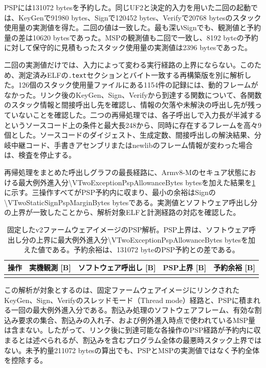 \documentclass[a4paper,10pt]{ltjsarticle}
\theoremstyle{definition}
\theoremstyle{remark}
\begin{document}
PSPには\num{131072} bytesを予約した。同じUF2と決定的入力を用いた二回の起動では、KeyGenで\num{91980} bytes、Signで\num{120452} bytes、Verifyで\num{20768} bytesのスタック使用量の実測値を得た。二回の値は一致した。最も深いSignでも、観測値と予約量の差は\num{10620} bytesであった。MSPの観測値も二回で一致し、\num{8192} byteの予約に対して保守的に見積もったスタック使用量の実測値は\num{2396} bytesであった。

二回の実測値だけでは、入力によって変わる実行経路の上界にならない。このため、測定済みELFの\texttt{.text}セクションとバイト一致する再構築版を別に解析した。126個のスタック使用量ファイルにある1154件の記録には、動的フレームがなかった。リンク後のKeyGen、Sign、Verifyから到達する関数について、各関数のスタック情報と間接呼出し先を確認し、情報の欠落や未解決の呼出し先が残っていないことを確認した。二つの再帰処理では、各子呼出しで入力長が半減するというソースコード上の条件と最大長248から、同時に存在するフレームを高々9個とした。ソースコードのダイジェスト、生成定数、間接呼出しの解決結果、分岐中継コード、手書きアセンブリまたはnewlibのフレーム情報が変わった場合は、検査を停止する。

再帰処理をまとめた呼出しグラフの最長経路に、Armv8-Mのセキュア状態における最大例外進入分\num{\VTwoExceptionPspAllowanceBytes} bytesを加えた結果を\cref{tab:v2-static-psp-bound}に示す。三操作すべてがPSP予約内に収まり、最小の余裕はSignの\num{\VTwoStaticSignPspMarginBytes} bytesである。実測値とソフトウェア呼出し分の上界が一致したことから、解析対象ELFと計測経路の対応を確認した。

\begin{table}[H]
  \centering
  \caption{固定したv2ファームウェアイメージのPSP解析。PSP上界は、ソフトウェア呼出し分の上界に最大例外進入分\num{\VTwoExceptionPspAllowanceBytes} bytesを加えた値である。予約余裕は、\num{131072} byteのPSP予約との差である。}
  \label{tab:v2-static-psp-bound}
  \small
  \begin{tabular}{@{}lrrrr@{}}
    \toprule
    操作 & 実機観測 [B] & ソフトウェア呼出し [B] & PSP上界 [B] & 予約余裕 [B] \\
    \midrule
    \\
    \bottomrule
  \end{tabular}
\end{table}

この解析が対象とするのは、固定ファームウェアイメージにリンクされたKeyGen、Sign、Verifyのスレッドモード（Thread mode）経路と、PSPに積まれる一回の最大例外進入分である。割込み処理のソフトウェアフレーム、有効な割込み要求の集合、割込みの入れ子、および例外進入時点で使われているMSP量は含まない。したがって、リンク後に到達可能な各操作のPSP経路が予約内に収まるとは述べられるが、割込みを含むプログラム全体の最悪時スタック上界ではない。未予約量\num{211072} bytesの算出でも、PSPとMSPの実測値ではなく予約全体を控除する。
\end{document}
